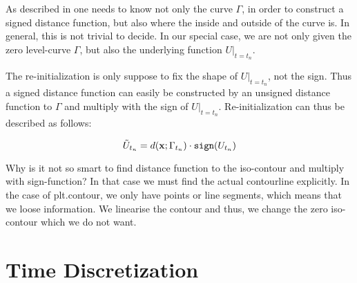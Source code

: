 As described in  one needs to know not only the curve $\Gamma$, in order to construct a signed distance function, but also where the inside and outside of the curve is. In general, this is not trivial to decide. In our special case, we are not only given the zero level-curve $\Gamma$, but also the underlying function $U|_{t=t_n}$. 

The re-initialization is only suppose to fix the shape of $U|_{t=t_n}$, not the sign. Thus a signed distance function can easily be constructed by an unsigned distance function to $\Gamma$ and multiply with the sign of $U|_{t=t_n}$. Re-initialization can thus be described as follows:

\begin{equation}
    \Tilde{U}_{t_n} = d(\mathbf{x}; \Gamma_{t_n})\cdot \texttt{sign}(U_{t_n})
\end{equation}


Why is it not so smart to find distance function to the iso-contour and multiply with sign-function?
In that case we must find the actual contourline explicitly. In the case of plt.contour, we only have 
points or line segments, which means that we loose information. We linearise the contour and thus, we change the zero iso-contour which we do not want.

\section{Time Discretization}


